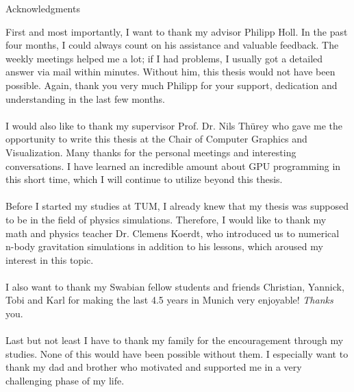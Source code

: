 \thispagestyle{empty}

\vspace*{20mm}

\begin{center}
{ Acknowledgments}
\end{center}

\vspace{10mm}


First and most importantly, I want to thank my advisor Philipp Holl. In the past four months, I could always count on his assistance and valuable feedback. The weekly meetings helped me a lot; if I had problems, I usually got a detailed answer via mail within minutes. Without him, this thesis would not have been possible. Again, thank you very much Philipp for your support, dedication and understanding in the last few months. \\\\
I would also like to thank my supervisor Prof. Dr. Nils Thürey who gave me the opportunity to write this thesis at the Chair of Computer Graphics and Visualization. Many thanks for the personal meetings and interesting conversations. I have learned an incredible amount about GPU programming in this short time, which I will continue to utilize beyond this thesis.\\\\
Before I started my studies at TUM, I already knew that my thesis was supposed to be in the field of physics simulations. Therefore, I would like to thank my math and physics teacher Dr. Clemens Koerdt, who introduced us to numerical n-body gravitation simulations in addition to his lessons, which aroused my interest in this topic.\\\\
I also want to thank my Swabian fellow students and friends Christian, Yannick, Tobi and Karl for making the last 4.5 years in Munich very enjoyable! \textit{Thanks} you.\\\\
Last but not least I have to thank my family for the encouragement through my studies. None of this would have been possible without them. I especially want to thank my dad and brother who motivated and supported me in a very challenging phase of my life.
\cleardoublepage{}
